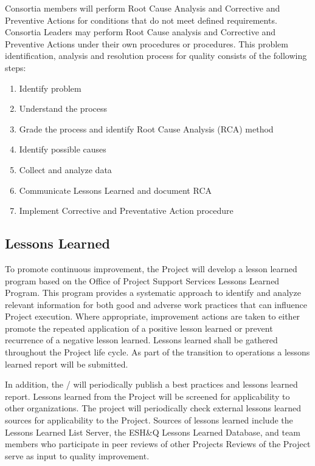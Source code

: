  Consortia members will perform Root Cause Analysis and Corrective
and Preventive Actions for conditions that do not meet defined
requirements. Consortia Leaders may perform Root Cause analysis and
Corrective and Preventive Actions under their own procedures or
\fnal procedures.  This problem identification, analysis and
resolution process for quality consists of the following steps:
\begin{enumerate}
 \item Identify problem
 \item Understand the process
 \item Grade the process and identify Root Cause Analysis (RCA) method
 \item Identify possible causes
 \item Collect and analyze data
 \item Communicate Lessons Learned and document RCA
 \item Implement Corrective and Preventative Action procedure
\end{enumerate}

\subsection{Lessons Learned}

To promote continuous improvement, the  Project will develop a
lesson learned program based on the \fnal Office of Project Support
Services Lessons Learned Program. This program provides a systematic
approach to identify and analyze relevant information for both good
and adverse work practices that can influence Project execution. Where
appropriate, improvement actions are taken to either promote the
repeated application of a positive lesson learned or prevent
recurrence of a negative lesson learned. Lessons learned shall be
gathered throughout the Project life cycle. As part of the transition
to operations a lessons learned report will be submitted.

In addition, the /  will periodically publish a best
practices and lessons learned report. Lessons learned from the 
Project will be screened for applicability to other organizations. The
 project will periodically check external lessons learned sources
for applicability to the  Project. Sources of lessons learned
include the  Lessons Learned List Server, the \fnal ESH\&Q
Lessons Learned Database, and  team members who participate in
peer reviews of other Projects Reviews of the  Project serve as
input to quality improvement.

